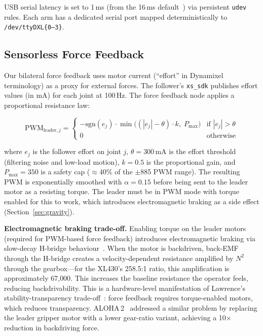 \documentclass[conference]{IEEEtran}
\begin{document}
USB serial latency is set to 1\,ms (from the 16\,ms default~\cite{ftdi_latency}) via persistent \texttt{udev} rules. Each arm has a dedicated serial port mapped deterministically to \texttt{/dev/ttyDXL\{0--3\}}.

\subsection{Sensorless Force Feedback}
\label{sec:force_feedback}

Our bilateral force feedback uses motor current (``effort'' in Dynamixel terminology) as a proxy for external forces. The follower's \texttt{xs\_sdk} publishes effort values (in mA) for each joint at 100\,Hz. The force feedback node applies a proportional resistance law:

\begin{equation}
    \text{PWM}_{\text{leader},j} = \begin{cases}
        -\text{sgn}(e_j) \cdot \min\!\big((|e_j| - \theta) \cdot k,\; P_{\max}\big) & \text{if } |e_j| > \theta \\
        0 & \text{otherwise}
    \end{cases}
    \label{eq:feedback}
\end{equation}

where $e_j$ is the follower effort on joint $j$, $\theta = 300$\,mA is the effort threshold (filtering noise and low-load motion), $k = 0.5$ is the proportional gain, and $P_{\max} = 350$ is a safety cap ($\approx$40\% of the $\pm$885 PWM range). The resulting PWM is exponentially smoothed with $\alpha = 0.15$ before being sent to the leader motor as a resisting torque. The leader must be in PWM mode with torque enabled for this to work, which introduces electromagnetic braking as a side effect (Section~\ref{sec:gravity}).

\textbf{Electromagnetic braking trade-off.} Enabling torque on the leader motors (required for PWM-based force feedback) introduces electromagnetic braking via slow-decay H-bridge behaviour~\cite{srikanth2008, colgate1994}. When the motor is backdriven, back-EMF through the H-bridge creates a velocity-dependent resistance amplified by $N^2$ through the gearbox---for the XL430's 258.5:1 ratio, this amplification is approximately 67{,}000. This increases the baseline resistance the operator feels, reducing backdrivability. This is a hardware-level manifestation of Lawrence's stability-transparency trade-off~\cite{lawrence_1993_stability}: force feedback requires torque-enabled motors, which reduces transparency. ALOHA\,2~\cite{aloha2_2024} addressed a similar problem by replacing the leader gripper motor with a lower gear-ratio variant, achieving a 10$\times$ reduction in backdriving force.
\end{document}
